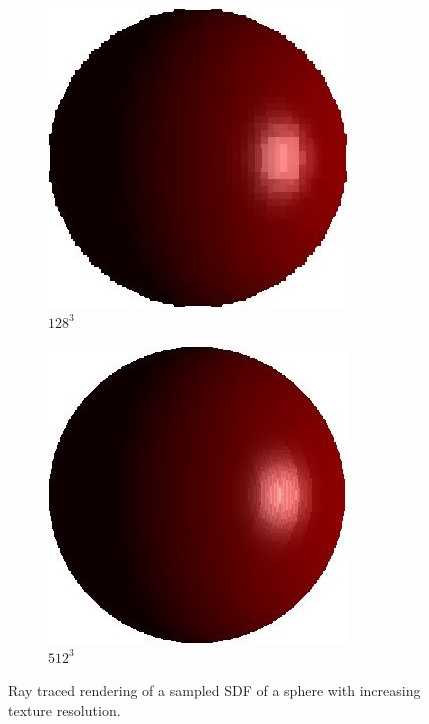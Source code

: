 \documentclass[10pt,a4paper,english, twocolumn]{article}
\begin{document}
\begin{figure}
\begin{subfigure}{.3\linewidth}
        \includegraphics[width=.9\linewidth]{figures/discretized_sdf_128.JPG}
        \caption{$128^3$}
        \label{sfig:sampled-sphere2}
    \end{subfigure}
    \begin{subfigure}{.3\linewidth}
        \centering
        \includegraphics[width=.9\linewidth]{figures/discretized_sdf_512.JPG}
        \caption{$512^3$}
        \label{sfig:sampled-sphere3}
    \end{subfigure}
    \caption{Ray traced rendering of a sampled SDF of a sphere with increasing texture resolution.}
    \label{fig:sampled-sphere}
\end{figure}
\end{document}

